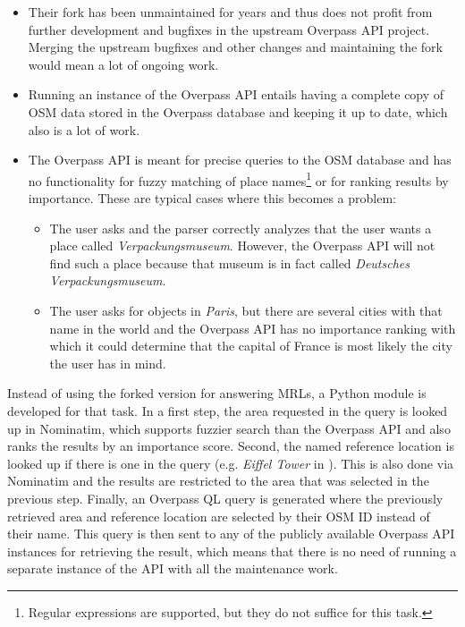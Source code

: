 \begin{itemize}
\item Their fork has been unmaintained for years and thus does not profit from
  further development and bugfixes in the upstream Overpass API project. Merging
  the upstream bugfixes and other changes and maintaining the fork would mean a
  lot of ongoing work.
\item Running an instance of the Overpass API entails having a complete copy of
  OSM data stored in the Overpass database and keeping it up to date, which also
  is a lot of work.
\item The Overpass API is meant for precise queries to the OSM database and has
  no functionality for fuzzy matching of place names\footnote{Regular
    expressions are supported, but they do not suffice for this task.} or for
  ranking results by importance. These are typical cases where this becomes a
  problem:
  \begin{itemize}
  \item The user asks  and the parser
    correctly analyzes that the user wants a place called
    \emph{Verpackungsmuseum}. However, the Overpass API will not find such a
    place because that museum is in fact called \emph{Deutsches
      Verpackungsmuseum}.
  \item The user asks for objects in \emph{Paris}, but there are several cities
    with that name in the world and the Overpass API has no importance ranking
    with which it could determine that the capital of France is most likely the
    city the user has in mind.
  \end{itemize}
\end{itemize}

Instead of using the forked version for answering MRLs, a Python module is
developed for that task. In a first step, the area requested in the query is
looked up in Nominatim, which supports fuzzier search than the Overpass API and
also ranks the results by an importance score. Second, the named reference
location is looked up if there is one in the query (e.g. \emph{Eiffel Tower} in
). This is also done via Nominatim and the
results are restricted to the area that was selected in the previous step.
Finally, an Overpass QL query is generated where the previously retrieved area
and reference location are selected by their OSM ID instead of their name. This
query is then sent to any of the publicly available Overpass API instances for
retrieving the result, which means that there is no need of running a separate
instance of the API with all the maintenance work.

